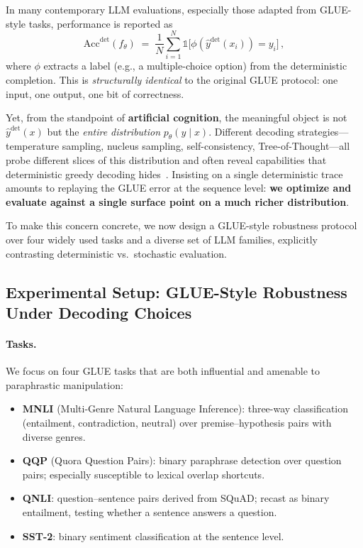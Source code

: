 In many contemporary LLM evaluations, especially those adapted from
GLUE-style tasks, performance is reported as
\[
  \text{Acc}^{\text{det}}(f_\theta) \;=\;
  \frac{1}{N} \sum_{i=1}^N
  \mathbb{1}\bigl[\phi(\hat{y}^{\text{det}}(x_i)) = y_i\bigr]\,,
\]
where $\phi$ extracts a label (e.g., a multiple-choice option) from the
deterministic completion. This is \emph{structurally identical} to the
original GLUE protocol: one input, one output, one bit of correctness.

Yet, from the standpoint of \textbf{artificial cognition}, the meaningful
object is not $\hat{y}^{\text{det}}(x)$ but the \emph{entire distribution}
$p_\theta(y \mid x)$. Different decoding strategies---temperature sampling,
nucleus sampling, self-consistency, Tree-of-Thought---all probe different
slices of this distribution and often reveal capabilities that deterministic
greedy decoding hides~\cite{holtzman2020degeneration,wang2022selfconsistency,yao2023treeofthought}.
Insisting on a single deterministic trace amounts to replaying the GLUE
error at the sequence level: \textbf{we optimize and evaluate against a
single surface point on a much richer distribution}.

To make this concern concrete, we now design a GLUE-style robustness
protocol over four widely used tasks and a diverse set of LLM families,
explicitly contrasting deterministic vs.\ stochastic evaluation.

\subsection{Experimental Setup: GLUE-Style Robustness Under Decoding Choices}
\label{subsec:glue-setup}

\paragraph{Tasks.}
We focus on four GLUE tasks that are both influential and amenable to
paraphrastic manipulation:

\begin{itemize}[leftmargin=1.5em]
  \item \textbf{MNLI} (Multi-Genre Natural Language Inference): three-way
        classification (entailment, contradiction, neutral) over
        premise--hypothesis pairs with diverse genres.
  \item \textbf{QQP} (Quora Question Pairs): binary paraphrase detection
        over question pairs; especially susceptible to lexical overlap
        shortcuts.
  \item \textbf{QNLI}: question--sentence pairs derived from SQuAD;
        recast as binary entailment, testing whether a sentence
        answers a question.
  \item \textbf{SST-2}: binary sentiment classification at the
        sentence level.
\end{itemize}

